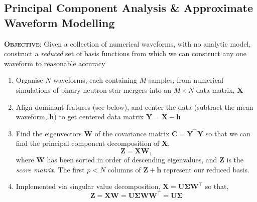 \documentclass[a0,landscape]{a0poster}
\newcommand{\matr}[1]{\mathbf{#1}}
\newcommand{\tran}[1]{#1^{\top}}
\begin{document}
\begin{multicols}{4}
%
%
%

\section*{\centering Principal Component Analysis \& Approximate Waveform Modelling}

{\bf \textsc{Objective}}: Given a collection of numerical waveforms, with no analytic
model, construct a \emph{reduced} set of basis functions from which we can
construct any one waveform to reasonable accuracy

\begin{enumerate}
    \item Organise $N$ waveforms, each containing $M$ samples, from
        numerical simulations of binary neutron star mergers into an $M\times N$
        data matrix, $\matr{X}$
    \item Align dominant features (see below), and center the data (subtract the
        mean waveform, $\matr{h}$) to get centered data matrix
        $\matr{Y}=\matr{X}-\matr{h}$
    \item Find the eigenvectors $\matr{W}$ of the covariance matrix
        $\matr{C} = \tran{\matr{Y}}\matr{Y}$ so that we can find the principal component
        decomposition of $\matr{X}$,
        \begin{equation}\label{eq:pca}
            \matr{Z} = \matr{X} \matr{W},
        \end{equation}
        where $\matr{W}$ has been sorted in order of descending eigenvalues, and
        $\matr{Z}$ is the \emph{score matrix}.  The first $p<N$ columns of
        $\matr{Z}+\matr{h}$ represent our reduced basis.
    \item Implemented via singular value decomposition, $\matr{X} =
        \matr{U}\matr{\Sigma}\tran{\matr{W}}$ so that,
        \begin{equation}
            \matr{Z} = \matr{X} \matr{W} =
            \matr{U}\matr{\Sigma}\matr{W}\tran{\matr{W}} = \matr{U}\matr{\Sigma}
        \end{equation}
\end{enumerate}



\end{multicols}
\end{document}
